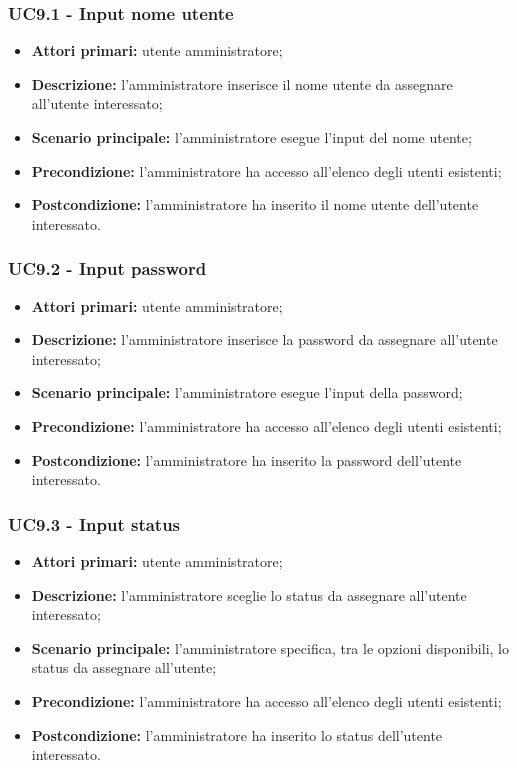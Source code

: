 \subsubsection{UC9.1 - Input nome utente}
	\begin{itemize}
		\item \textbf{Attori primari:} utente amministratore;
		\item \textbf{Descrizione:} l'amministratore inserisce il nome utente da assegnare all'utente interessato;
		\item \textbf{Scenario principale:} l'amministratore esegue l'input del nome utente;
		\item \textbf{Precondizione:} l'amministratore ha accesso all'elenco degli utenti esistenti;
		\item \textbf{Postcondizione:} l'amministratore ha inserito il nome utente dell'utente interessato.
	\end{itemize}

\subsubsection{UC9.2 - Input password}
	\begin{itemize}
		\item \textbf{Attori primari:} utente amministratore;
		\item \textbf{Descrizione:} l'amministratore inserisce la password da assegnare all'utente interessato;
		\item \textbf{Scenario principale:} l'amministratore esegue l'input della password;
		\item \textbf{Precondizione:} l'amministratore ha accesso all'elenco degli utenti esistenti;
		\item \textbf{Postcondizione:} l'amministratore ha inserito la password dell'utente interessato.
	\end{itemize}

\subsubsection{UC9.3 - Input status}
\begin{itemize}
	\item \textbf{Attori primari:} utente amministratore;
	\item \textbf{Descrizione:} l'amministratore sceglie lo status da assegnare all'utente interessato;
	\item \textbf{Scenario principale:} l'amministratore specifica, tra le opzioni disponibili, lo status da assegnare all'utente;
	\item \textbf{Precondizione:} l'amministratore ha accesso all'elenco degli utenti esistenti;
	\item \textbf{Postcondizione:} l'amministratore ha inserito lo status dell'utente interessato.
\end{itemize}

